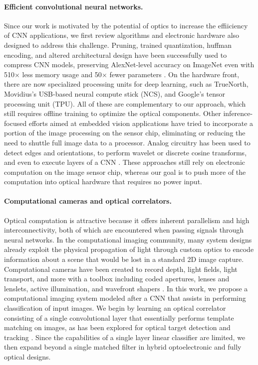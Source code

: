 \paragraph{Efficient convolutional neural networks.} 
Since our work is motivated by the potential of optics to increase the effiiciency of CNN applications, we first review algorithms and electronic hardware also designed to address this challenge. Pruning, trained quantization, huffman encoding, and altered architectural design have been successfully used to compress CNN models,  preserving AlexNet-level accuracy on ImageNet even with 510$\times$ less memory usage and 50$\times$ fewer parameters \cite{han2015deep,iandola2016squeezenet}. On the hardware front, there are now specialized processing units for deep learning, such as TrueNorth, Movidius's USB-based neural compute stick (NCS), and Google's tensor processing unit (TPU). All of these are complementary to our approach, which still requires offline training to optimize the optical components. Other inference-focused efforts aimed at embedded vision applications have tried to incorporate a portion of the image processing on the sensor chip, eliminating or reducing the need to shuttle full image data to a processor. Analog circuitry has been used to detect edges and orientations, to perform wavelet or discrete cosine transforms, and even to execute layers of a CNN \cite{gruev2002implementation,likamwa2016redeye}. These approaches still rely on electronic computation on the image sensor chip, whereas our goal is to push more of the computation into optical hardware that requires no power input. 


\paragraph{Computational cameras and optical correlators.} Optical computation is attractive because it offers inherent parallelism and high interconnectivity, both of which are encountered when passing signals through neural networks. In the computational imaging community, many system designs already exploit the physical propagation of light through custom optics to encode information about a scene that would be lost in a standard 2D image capture. Computational cameras have been created to record depth, light fields, light transport, and more with a toolbox including coded apertures, lenses and lenslets, active illumination, and wavefront shapers \cite{ng2005light,levin2007image,mcguire2007optical,o2010optical,chang2016variable}. In this work, we propose a computational imaging system modeled after a CNN that assists in performing classification of input images. We begin by learning an optical correlator consisting of a single convolutional layer that essentially performs template matching on images, as has been explored for optical target detection and tracking \cite{gregory1986real,manzur2012optical,javidi1995optical}. Since the capabilities of a single layer linear classifier are limited, we then expand beyond a single matched filter in hybrid optoelectronic and fully optical designs.

